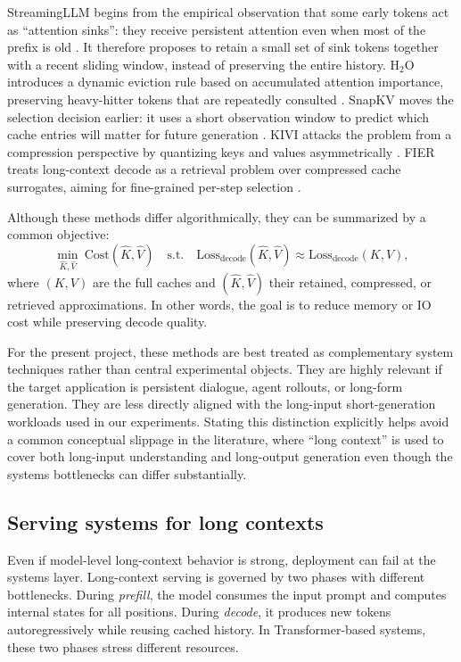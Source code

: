 \documentclass{article}
\begin{document}
StreamingLLM begins from the empirical observation that some early tokens act as ``attention sinks'': they receive persistent attention even when most of the prefix is old \citep{xiao2023streamingllm}. It therefore proposes to retain a small set of sink tokens together with a recent sliding window, instead of preserving the entire history. H$_2$O introduces a dynamic eviction rule based on accumulated attention importance, preserving heavy-hitter tokens that are repeatedly consulted \citep{zhang2023h2o}. SnapKV moves the selection decision earlier: it uses a short observation window to predict which cache entries will matter for future generation \citep{li2024snapkv}. KIVI attacks the problem from a compression perspective by quantizing keys and values asymmetrically \citep{liu2024kivi}. FIER treats long-context decode as a retrieval problem over compressed cache surrogates, aiming for fine-grained per-step selection \citep{wang2025fier}.

Although these methods differ algorithmically, they can be summarized by a common objective:
\begin{equation}
\min_{\hat{K},\hat{V}} \ \mathrm{Cost}(\hat{K},\hat{V})
\quad \text{s.t.} \quad
\mathrm{Loss}_{\mathrm{decode}}(\hat{K},\hat{V}) \approx \mathrm{Loss}_{\mathrm{decode}}(K,V),
\end{equation}
where $(K,V)$ are the full caches and $(\hat{K},\hat{V})$ their retained, compressed, or retrieved approximations. In other words, the goal is to reduce memory or IO cost while preserving decode quality.

For the present project, these methods are best treated as complementary system techniques rather than central experimental objects. They are highly relevant if the target application is persistent dialogue, agent rollouts, or long-form generation. They are less directly aligned with the long-input short-generation workloads used in our experiments. Stating this distinction explicitly helps avoid a common conceptual slippage in the literature, where ``long context'' is used to cover both long-input understanding and long-output generation even though the systems bottlenecks can differ substantially.

\subsection{Serving systems for long contexts}
Even if model-level long-context behavior is strong, deployment can fail at the systems layer. Long-context serving is governed by two phases with different bottlenecks. During \emph{prefill}, the model consumes the input prompt and computes internal states for all positions. During \emph{decode}, it produces new tokens autoregressively while reusing cached history. In Transformer-based systems, these two phases stress different resources.
\end{document}
